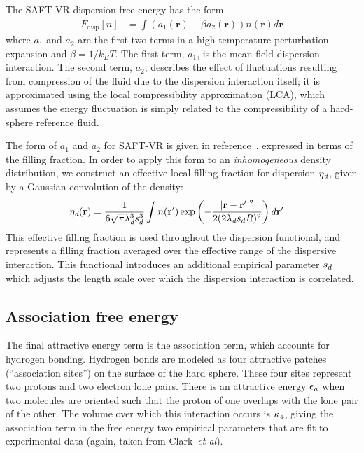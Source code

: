 \documentclass[letterpaper,twocolumn,amsmath,amssymb,prb]{revtex4-1}
\newcommand{\xx}{\textbf{r}}
\begin{document}
The SAFT-VR dispersion free energy has the form~\cite{gil-villegas-1997-SAFT-VR}
\begin{align}
  F_\text{disp}[n] &= \int \left(a_1(\xx) + \beta a_2(\xx)\right)n(\xx)d\xx
\end{align}
where $a_1$ and $a_2$ are the first two terms in a high-temperature
perturbation expansion and $\beta=1/k_BT$.  The first term, $a_1$, is 
the mean-field dispersion interaction. The second term, $a_2$, describes the
effect of fluctuations resulting from compression of the fluid due
to the dispersion interaction itself; it is approximated
using the local compressibility approximation (LCA), which
assumes the energy fluctuation is simply related to the
compressibility of a hard-sphere reference fluid\cite{barker1976liquid}.

The form of $a_1$ and $a_2$ for SAFT-VR is given in
reference~\cite{gil-villegas-1997-SAFT-VR}, expressed in terms
of the filling fraction.  In order to apply this form to an
\emph{inhomogeneous} density distribution, we construct an effective local
filling fraction for dispersion $\eta_\textit{d}$, given by a Gaussian
convolution of the density:
\begin{align}
  \etadisp(\xx) &= \frac{1}{6\sqrt{\pi} \lambdadisp^3\lscale^3}
  \int n(\xx')\exp\left({-\frac{|\xx-\xx'|^2}{2(2 \lambdadisp
      \lscale R)^2}}\right)d\xx'
\end{align}
This effective filling fraction is used throughout the dispersion
functional, and represents a filling fraction averaged over the
effective range of the dispersive interaction.  This functional
introduces an additional empirical parameter $s_d$ which adjusts
the length scale over which the dispersion interaction is correlated.

\subsection{Association free energy}
The final attractive energy term is the association term, which
accounts for hydrogen bonding.  Hydrogen bonds are modeled as four
attractive patches (``association sites'') on the surface of the hard
sphere.  These four sites represent two protons and two electron lone
pairs.  There is an attractive energy $\epsilon_\textit{a}$ when
two molecules are oriented such that the proton of one overlaps
with the lone pair of the other.  The volume over which this
interaction occurs is $\kappa_\textit{a}$, giving the association
term in the free energy two empirical parameters that are fit to
experimental data (again, taken from Clark~\emph{et
  al}\cite{clark2006developing}).
\end{document}
